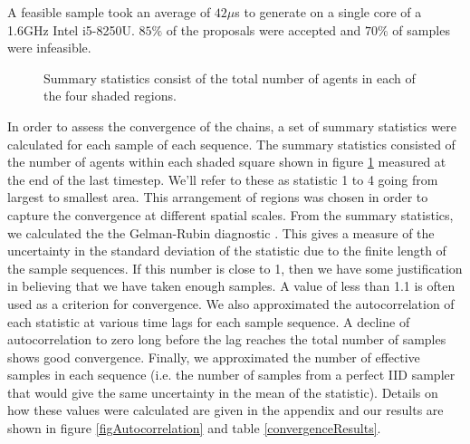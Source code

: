 \documentclass{article}
\begin{document}
A feasible sample took an average of $42\mu$s to generate on a single core of a 1.6GHz Intel i5-8250U. $85\%$ of the proposals were accepted and $70\%$ of samples were infeasible. 

\begin{figure}
	\centering
	\caption{Summary statistics consist of the total number of agents in each of the four shaded regions.}
	\label{figRegions}
\end{figure}
In order to assess the convergence of the chains, a set of summary statistics were calculated for each sample of each sequence. The summary statistics consisted of the number of agents within each shaded square shown in figure \ref{figRegions} measured at the end of the last timestep. We'll refer to these as statistic 1 to 4 going from largest to smallest area. This arrangement of regions was chosen in order to capture the convergence at different spatial scales. From the summary statistics, we calculated the the Gelman-Rubin diagnostic \citep{gelman1992inference}. This gives a measure of the uncertainty in the standard deviation of the statistic due to the finite length of the sample sequences. If this number is close to 1, then we have some justification in believing that we have taken enough samples. A value of less than 1.1 is often used as a criterion for convergence. We also approximated the autocorrelation of each statistic at various time lags for each sample sequence. A decline of autocorrelation to zero long before the lag reaches the total number of samples shows good convergence. Finally, we approximated the number of effective samples in each sequence (i.e. the number of samples from a perfect IID sampler that would give the same uncertainty in the mean of the statistic). Details on how these values were calculated are given in the appendix and our results are shown in figure \ref{figAutocorrelation} and table \ref{convergenceResults}.
\end{document}
